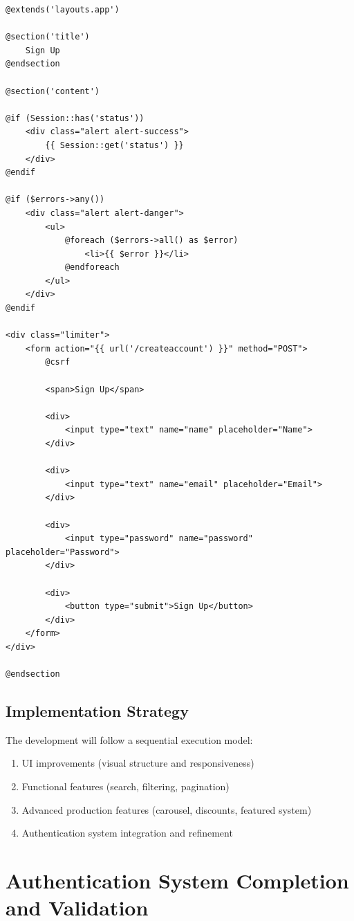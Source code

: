 \documentclass[12pt,a4paper]{article}
\begin{document}
\begin{verbatim}
@extends('layouts.app')

@section('title')
    Sign Up
@endsection

@section('content')

@if (Session::has('status'))
    <div class="alert alert-success">
        {{ Session::get('status') }}
    </div>
@endif

@if ($errors->any())
    <div class="alert alert-danger">
        <ul>
            @foreach ($errors->all() as $error)
                <li>{{ $error }}</li>
            @endforeach
        </ul>
    </div>
@endif

<div class="limiter">
    <form action="{{ url('/createaccount') }}" method="POST">
        @csrf

        <span>Sign Up</span>

        <div>
            <input type="text" name="name" placeholder="Name">
        </div>

        <div>
            <input type="text" name="email" placeholder="Email">
        </div>

        <div>
            <input type="password" name="password" placeholder="Password">
        </div>

        <div>
            <button type="submit">Sign Up</button>
        </div>
    </form>
</div>

@endsection
\end{verbatim}

\subsection{Implementation Strategy}

The development will follow a sequential execution model:

\begin{enumerate}[noitemsep]
    \item UI improvements (visual structure and responsiveness)
    \item Functional features (search, filtering, pagination)
    \item Advanced production features (carousel, discounts, featured system)
    \item Authentication system integration and refinement
\end{enumerate}


\section{Authentication System Completion and Validation}
\end{document}
